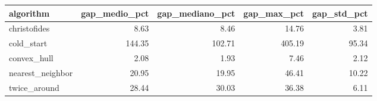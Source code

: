 \begin{tabular}{lrrrr}
\toprule
algorithm & gap\_medio\_pct & gap\_mediano\_pct & gap\_max\_pct & gap\_std\_pct \\
\midrule
christofides & 8.63 & 8.46 & 14.76 & 3.81 \\
cold\_start & 144.35 & 102.71 & 405.19 & 95.34 \\
convex\_hull & 2.08 & 1.93 & 7.46 & 2.12 \\
nearest\_neighbor & 20.95 & 19.95 & 46.41 & 10.22 \\
twice\_around & 28.44 & 30.03 & 36.38 & 6.11 \\
\bottomrule
\end{tabular}
